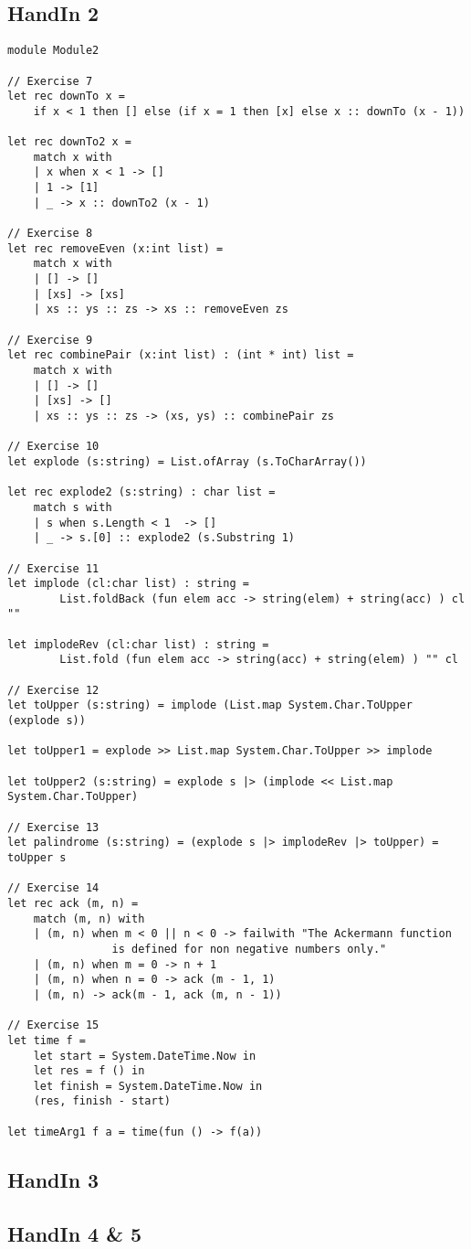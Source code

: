 \subsection{HandIn 2}
\label{Appendix_FSharp_Melnyk_2}
\begin{lstlisting}
module Module2

// Exercise 7
let rec downTo x = 
	if x < 1 then [] else (if x = 1 then [x] else x :: downTo (x - 1))

let rec downTo2 x = 
    match x with
    | x when x < 1 -> []
    | 1 -> [1]
    | _ -> x :: downTo2 (x - 1)

// Exercise 8
let rec removeEven (x:int list) = 
    match x with 
    | [] -> []
    | [xs] -> [xs]
    | xs :: ys :: zs -> xs :: removeEven zs

// Exercise 9
let rec combinePair (x:int list) : (int * int) list = 
    match x with
    | [] -> []
    | [xs] -> []
    | xs :: ys :: zs -> (xs, ys) :: combinePair zs

// Exercise 10
let explode (s:string) = List.ofArray (s.ToCharArray())

let rec explode2 (s:string) : char list = 
    match s with
    | s when s.Length < 1  -> []
    | _ -> s.[0] :: explode2 (s.Substring 1)

// Exercise 11
let implode (cl:char list) : string = 
		List.foldBack (fun elem acc -> string(elem) + string(acc) ) cl ""

let implodeRev (cl:char list) : string = 
		List.fold (fun elem acc -> string(acc) + string(elem) ) "" cl 

// Exercise 12
let toUpper (s:string) = implode (List.map System.Char.ToUpper (explode s))

let toUpper1 = explode >> List.map System.Char.ToUpper >> implode

let toUpper2 (s:string) = explode s |> (implode << List.map System.Char.ToUpper)

// Exercise 13
let palindrome (s:string) = (explode s |> implodeRev |> toUpper) = toUpper s

// Exercise 14
let rec ack (m, n) = 
    match (m, n) with
    | (m, n) when m < 0 || n < 0 -> failwith "The Ackermann function 
				is defined for non negative numbers only."
    | (m, n) when m = 0 -> n + 1
    | (m, n) when n = 0 -> ack (m - 1, 1)
    | (m, n) -> ack(m - 1, ack (m, n - 1))

// Exercise 15
let time f = 
    let start = System.DateTime.Now in
    let res = f () in
    let finish = System.DateTime.Now in
    (res, finish - start)

let timeArg1 f a = time(fun () -> f(a))
\end{lstlisting}
\subsection{HandIn 3}
\label{Appendix_FSharp_Melnyk_3}
\subsection{HandIn 4 \& 5}
\label{Appendix_FSharp_Melnyk_4and5}